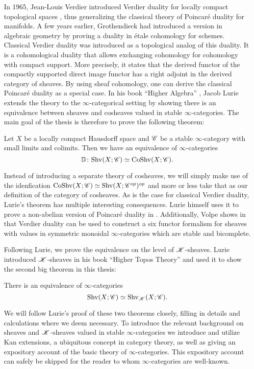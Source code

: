 \documentclass[../../thesis.tex]{subfiles}
\begin{document}
In 1965, Jean-Louis Verdier introduced Verdier duality for locally compact topological spaces \cite{Verdier95}, thus generalizing the classical theory of Poincaré duality for manifolds.
A few years earlier, Grothendieck had introduced a version in algebraic geometry by proving a duality in étale cohomology for schemes.
Classical Verdier duality was introduced as a topological analog of this duality.
It is a cohomological duality that allows exchanging cohomology for cohomology with compact support.
More precisely, it states that the derived functor of the compactly supported direct image functor has a right adjoint in the derived category of sheaves.
By using sheaf cohomology, one can derive the classical Poincaré duality as a special case.
In his book ``Higher Algebra'' \cite{HA}, Jacob Lurie extends the theory to the $\infty$-categorical setting by showing there is an equivalence between sheaves and cosheaves valued in stable $\infty$-categories.
The main goal of the thesis is therefore to prove the following theorem:
\begin{theorem*}[\ref{VerdierDuality}]
    Let $X$ be a locally compact Hausdorff space and $\mathscr{C}$ be a stable $\infty$-category with small limits and colimits.
    Then we have an equivalence of $\infty$-categories
    \[
        \mathbb{D} \colon \mathrm{Shv}(X;\mathscr{C}) \simeq \mathrm{CoShv}(X;\mathscr{C}).
    \]
\end{theorem*}
Instead of introducing a separate theory of cosheaves, we will simply make use of the idenfication $\mathrm{CoShv}(X;\mathscr{C})\simeq \mathrm{Shv}(X;\mathscr{C}^{op})^{op}$ and more or less take that as our definition of the category of cosheaves.
As is the case for classical Verdier duality, Lurie's theorem has multiple interesting consequences.
Lurie himself uses it to prove a non-abelian version of Poincaré duality in \cite{HA}.
Additionally, Volpe shows in \cite{Volpe} that Verdier duality can be used to construct a six functor formalism for sheaves with values in symmetric monoidal $\infty$-categories which are stable and bicomplete.


Following Lurie, we prove the equivalence on the level of $\mathscr{K}$-sheaves.
Lurie introduced $\mathscr{K}$-sheaves in his book ``Higher Topos Theory'' \cite{HTT} and used it to show the second big theorem in this thesis:
\begin{theorem*}[\ref{7.3.4.9}]
    There is an equivalence of $\infty$-categories
    \[
        \mathrm{Shv}(X;\mathscr{C}) \simeq \mathrm{Shv}_{\mathscr{K}}(X;\mathscr{C}).
    \]
\end{theorem*}
We will follow Lurie's proof of these two theorems closely, filling in details and calculations where we deem necessary.
To introduce the relevant background on sheaves and $\mathscr{K}$-sheaves valued in stable $\infty$-categories we introduce and utilize Kan extensions, a ubiquitous concept in category theory, as well as giving an expository account of the basic theory of $\infty$-categories.
This expository account can safely be skipped for the reader to whom $\infty$-categories are well-known.
\end{document}
